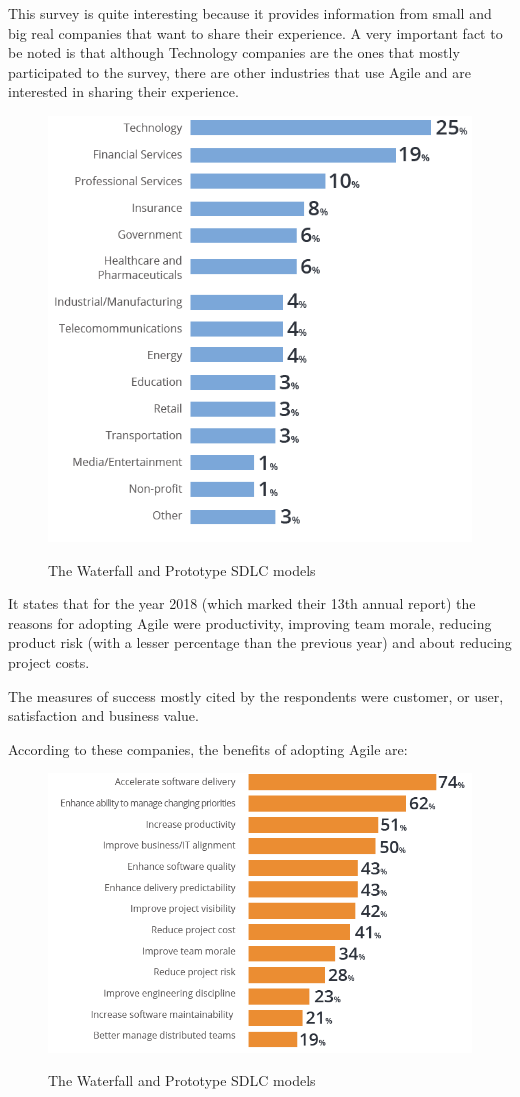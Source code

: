 	This survey is quite interesting because it provides information from small and big real companies that want to share their experience.
	A very important fact to be noted is that although Technology companies are the ones that mostly participated to the survey, there are other industries that use Agile and are interested in sharing their experience.

	\begin{figure}[H]
		\centering
		\includegraphics[width=.8\textwidth]{resources/Untitled_2}\\
		\caption{The Waterfall and Prototype SDLC models}
	\end{figure}

	It states that for the year 2018 (which marked their 13th annual report) the reasons for adopting Agile were productivity, improving team morale, reducing product risk (with a lesser percentage than the previous year) and about reducing project costs.

	The measures of success mostly cited by the respondents were customer, or user, satisfaction and business value.

	According to these companies, the benefits of adopting Agile are:
	\begin{figure}[H]
		\centering
		\includegraphics[width=.8\textwidth]{resources/Untitled}\\
		\caption{The Waterfall and Prototype SDLC models}
	\end{figure}

